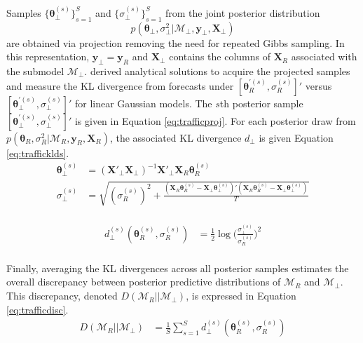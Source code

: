 Samples $\{\bm{\theta}^{(s)}_\perp\}_{s=1}^S$ and $\{\sigma^{(s)}_\perp\}_{s=1}^S$ from the joint posterior distribution $$p(\bm{\theta}_\perp,\sigma^2_\perp|\mathcal{M}_\perp,\bm{y}_\perp,\bm{X}_\perp)$$ are obtained via projection removing the need for repeated Gibbs sampling. In this representation, $\bm{y}_\perp=\bm{y}_R$ and $\bm{X}_\perp$ contains the columns of $\bm{X}_R$ associated with the submodel $\mathcal{M}_\perp$. \cite{Piironen2017} derived analytical solutions to acquire the projected samples and measure the KL divergence from forecasts under $[\bm{\theta}^{'(s)}_R,\sigma^{(s)}_R]'$ versus $[\bm{\theta}^{'(s)}_\perp,\sigma^{(s)}_\perp]'$ for linear Gaussian models. The $s$th posterior sample  $[\bm{\theta}^{'(s)}_\perp,\sigma^{(s)}_\perp]'$ is given in Equation \ref{eq:trafficproj}. For each posterior draw from $p(\bm{\theta}_R,\sigma^2_R|\mathcal{M}_{R},\bm{y}_R,\bm{X}_R)$, the associated KL divergence $d_{\perp}$ is given Equation \ref{eq:trafficklds}. 
\begin{equation}
\label{eq:trafficproj}
\begin{split}
\bm{\theta}^{(s)}_\perp&=(\bm{X}'_\perp\bm{X}_\perp)^{-1} \bm{X}'_\perp \bm{X}_R\bm{\theta}^{(s)}_R\\
\sigma^{(s)}_\perp&=\sqrt{(\sigma^{(s)}_R)^2+\frac{(\bm{X}_R\bm{\theta}^{(s)}_R-\bm{X}_\perp\bm{\theta}^{(s)}_\perp)'(\bm{X}_R\bm{\theta}^{(s)}_R-\bm{X}_\perp\bm{\theta}^{(s)}_\perp)}{T}                                  }\\
\end{split}
\end{equation}

\begin{equation}
\label{eq:trafficklds}
\begin{split}
d^{(s)}_{\perp}(\bm{\theta}^{(s)}_R,\sigma^{(s)}_R)&=\frac{1}{2}\log\bigg(\frac{\sigma^{(s)}_\perp}{\sigma^{(s)}_R}\bigg)^2\\
\end{split}
\end{equation}

Finally, averaging the KL divergences across all posterior samples estimates the overall discrepancy between posterior predictive distributions of $\mathcal{M}_R$ and $\mathcal{M}_\perp$. This discrepancy, denoted $D(\mathcal{M}_{R}||\mathcal{M}_\perp)$, is expressed in Equation \ref{eq:trafficdisc}. 
\begin{equation}
\label{eq:trafficdisc}
\begin{split}
D(\mathcal{M}_{R}||\mathcal{M}_\perp)&=\frac{1}{S}\sum\limits^S_{s=1} d^{(s)}_{\perp}(\bm{\theta}^{(s)}_R,\sigma^{(s)}_R)   \\
\end{split}
\end{equation}

